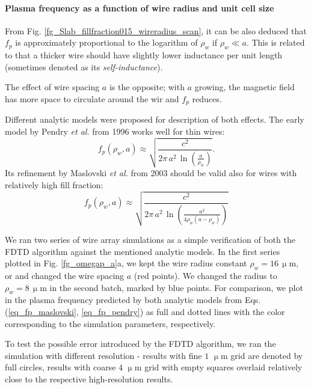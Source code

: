 \paragraph{Plasma frequency as a function of wire radius and unit cell size}%
From Fig.  \ref{fg_Slab_fillfraction015_wireradius_scan}, it can be also deduced that $f_p$ is approximately proportional to the logarithm of $\rho_w$ if $\rho_w \ll a$. This is related to that a thicker wire should have slightly lower inductance per unit length (sometimes denoted as its \textit{self-inductance}). 

The effect of wire spacing $a$ is the opposite; with $a$ growing, the magnetic field has more space to circulate around the wir and $f_p$ reduces. 

Different analytic models were proposed for description of both effects. The early model by Pendry \textit{et al.} from 1996 \cite{pendry1996extremely} works well for thin wires: 
\begin{equation} f_p(\rho_w,a) \approx \sqrt{\frac{c^2}{2\pi \, a^2 \, \ln(\frac{a}{\rho_w})}}. \label{eq_fp_pendry}\end{equation}
Its refinement by Maslovski \textit{et al.} from 2003 \cite{maslovski2002wire} should be valid also for wires with relatively high fill fraction:
\begin{equation} f_p(\rho_w,a) \approx \sqrt{\frac{c^2}{2\pi \, a^2 \, \ln\left(\frac{a^2}{4\rho_w (a-\rho_w)}\right)}} \label{eq_fp_maslovski}\end{equation}

We ran two series of wire array simulations as a simple verification of both the FDTD algorithm against the mentioned analytic models. In the first series plotted in Fig. \ref{fg_omegap_a}a, we kept the wire radius constant $\rho_w = 16\,\upmu$m, or and changed the wire spacing $a$ (red points). We changed the radius to $\rho_w = 8\,\upmu$m in the second batch, marked by blue points. For comparison, we plot in the plasma frequency predicted by both analytic models from Eqs. (\ref{eq_fp_maslovski}, \ref{eq_fp_pendry}) as full and dotted lines with the color corresponding to the simulation parameters, respectively. 

To test the possible error introduced by the FDTD algorithm, we ran the simulation with different resolution - results with fine $1$ $\upmu$m grid are denoted by full circles, results with coarse $4$ $\upmu$m grid with empty squares overlaid relatively close to the respective high-resolution results.

